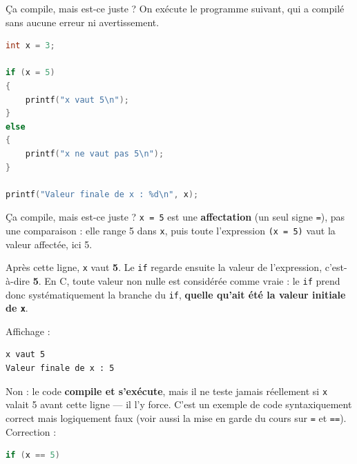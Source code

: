 \begin{UPSTIexercice}{Ça compile, mais est-ce juste ?}
    On exécute le programme suivant, qui a compilé sans aucune erreur ni avertissement.
    \begin{lstlisting}[language=C]
int x = 3;

if (x = 5)
{
    printf("x vaut 5\n");
}
else
{
    printf("x ne vaut pas 5\n");
}

printf("Valeur finale de x : %d\n", x);
    \end{lstlisting}
\end{UPSTIexercice}

\begin{UPSTIprofOnlyEnv}
    \begin{UPSTIcorrectionP}{Ça compile, mais est-ce juste ?}
        \texttt{x = 5} est une \textbf{affectation} (un seul signe \texttt{=}), pas une comparaison : elle range 5 dans \texttt{x}, puis toute l'expression \texttt{(x = 5)} \og vaut \fg{} la valeur affectée, ici 5.

        Après cette ligne, \texttt{x} vaut \textbf{5}. Le \texttt{if} regarde ensuite la valeur de l'expression, c'est-à-dire \textbf{5}. En C, toute valeur non nulle est considérée comme vraie : le \texttt{if} prend donc systématiquement la branche du \texttt{if}, \textbf{quelle qu'ait été la valeur initiale de \texttt{x}}.

        Affichage :
        \begin{lstlisting}[language=bash,style=console]
x vaut 5
Valeur finale de x : 5
        \end{lstlisting}

        Non : le code \textbf{compile et s'exécute}, mais il ne teste jamais réellement si \texttt{x} valait 5 avant cette ligne --- il l'y force. C'est un exemple de code syntaxiquement correct mais logiquement faux (voir aussi la mise en garde du cours sur \texttt{=} et \texttt{==}). Correction :
        \begin{lstlisting}[language=C]
if (x == 5)
        \end{lstlisting}
    \end{UPSTIcorrectionP}
\end{UPSTIprofOnlyEnv}


